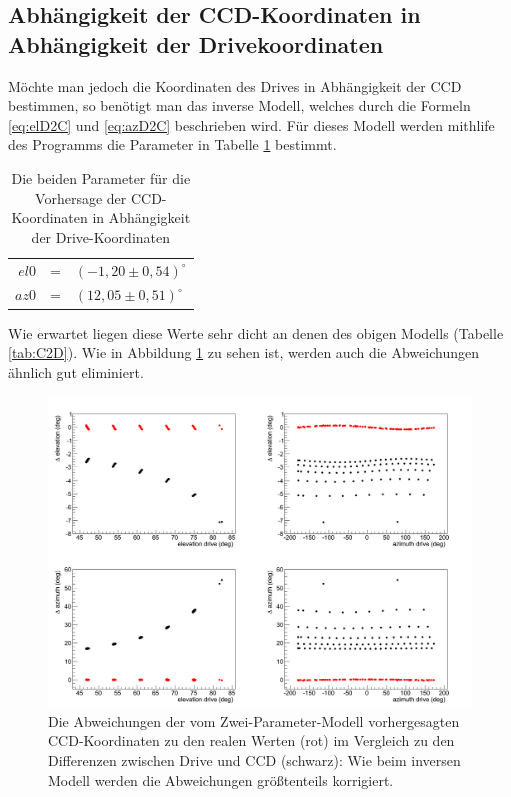 \subsection{Abhängigkeit der CCD-Koordinaten in Abhängigkeit der Drivekoordinaten}
Möchte man jedoch die Koordinaten des Drives in Abhängigkeit der CCD bestimmen, so benötigt man das inverse Modell, welches durch die Formeln \ref{eq:elD2C} und \ref{eq:azD2C} beschrieben wird. Für dieses Modell werden mithlife des Programms die Parameter in Tabelle \ref{tab:D2C} bestimmt.
\begin{table}[htbp]
\centering
\begin{tabular}{rcl}
\toprule
$el0$ &=& $(-1,20\pm0,54)^{\circ}$\\
$az0$ &=& $(12,05\pm0,51)^{\circ}$\\
\bottomrule
\end{tabular}
\label{tab:D2C}
\caption{Die beiden Parameter für die Vorhersage der CCD-Koordinaten in Abhängigkeit der Drive-Koordinaten}
\label{tab:D2C}
\end{table}
Wie erwartet liegen diese Werte sehr dicht an denen des obigen Modells (Tabelle \ref{tab:C2D}). Wie in Abbildung \ref{img:D2Ccomp} zu sehen ist, werden auch die Abweichungen ähnlich gut eliminiert. 
\begin{figure}[htbp]
\centering
\includegraphics[width=\textwidth]{../341/D2Ccomp.png}
\caption{Die Abweichungen der vom Zwei-Parameter-Modell vorhergesagten CCD-Koordinaten zu den realen Werten (rot) im Vergleich zu den Differenzen zwischen Drive und CCD (schwarz): Wie beim inversen Modell werden die Abweichungen größtenteils korrigiert.}
\label{img:D2Ccomp}
\end{figure}
